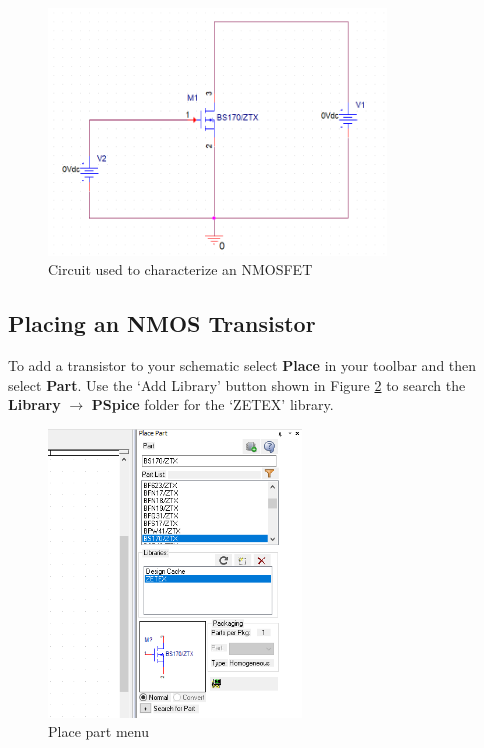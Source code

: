 \documentclass[12pt]{../manual}
\begin{document}
\begin{figure}[ht!]
\begin{center}
\includegraphics[width=0.8\textwidth]{figures/characterizeNMOS}
\end{center}
\caption{Circuit used to characterize an NMOSFET}
\label{fig:nmosfet}
\end{figure}

\newpage
\subsection{Placing an NMOS Transistor}
To add a transistor to your schematic select \textbf{Place} in your toolbar and then select \textbf{Part}. Use the `Add Library' button shown in Figure \ref{fig:placemenu} to search the \textbf{Library} $\to$ \textbf{PSpice} folder for the `ZETEX’ library.

\begin{figure}[ht!]
\begin{center}
\includegraphics[width=0.6\textwidth]{figures/placeMenu}
\end{center}
\caption{Place part menu}
\label{fig:placemenu}
\end{figure}
\end{document}
